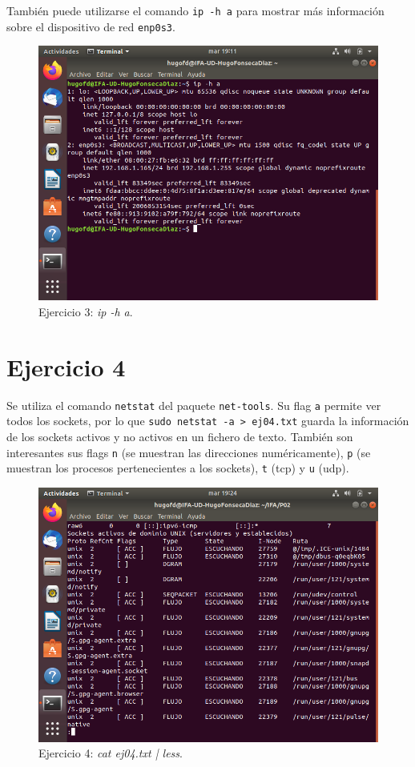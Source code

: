 \documentclass[11pt]{article}
\begin{document}
También puede utilizarse el comando \verb|ip -h a| para mostrar más información sobre el dispositivo de red \verb|enp0s3|.

\begin{figure}[H]
    \caption{Ejercicio 3: \textit{ip -h a}.}
  \centering
  \includegraphics{e3-3.png}
\end{figure}

\section{Ejercicio 4}
Se utiliza el comando \verb|netstat| del paquete \verb|net-tools|. Su flag \verb|a| permite ver todos los sockets, por lo que \verb|sudo netstat -a > ej04.txt| guarda la información de los sockets activos y no activos en un fichero de texto. También son interesantes sus flags \verb|n| (se muestran las direcciones numéricamente), \verb|p| (se muestran los procesos pertenecientes a los sockets), \verb|t| (tcp) y \verb|u| (udp).

\begin{figure}[H]
    \caption{Ejercicio 4: \textit{cat ej04.txt | less}.}
  \centering
  \includegraphics{e4-1.png}
\end{figure}
\end{document}
